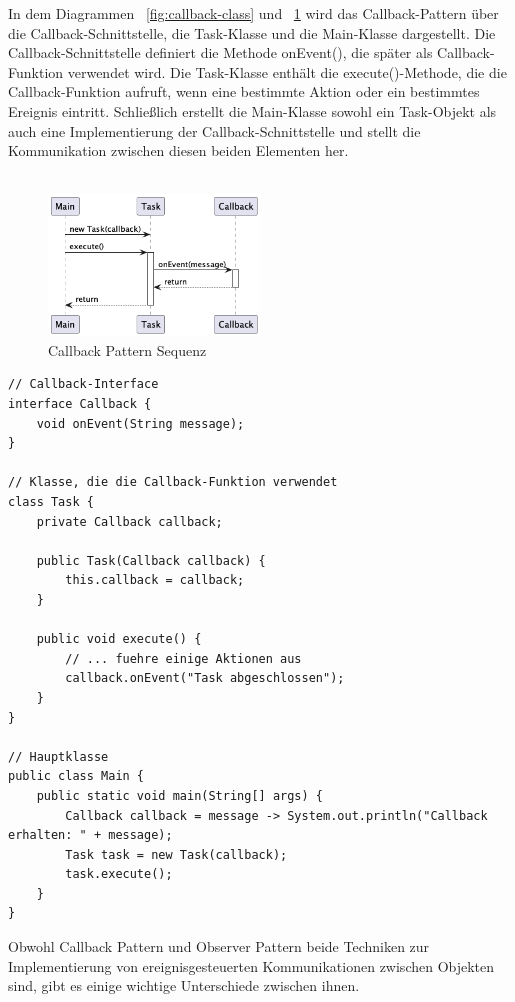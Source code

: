In dem Diagrammen ~\ref{fig:callback-class} und ~\ref{fig:callback-seq} wird das Callback-Pattern über die Callback-Schnittstelle, die Task-Klasse und die Main-Klasse dargestellt. Die Callback-Schnittstelle definiert die Methode onEvent(), die später als Callback-Funktion verwendet wird. Die Task-Klasse enthält die execute()-Methode, die die Callback-Funktion aufruft, wenn eine bestimmte Aktion oder ein bestimmtes Ereignis eintritt. Schließlich erstellt die Main-Klasse sowohl ein Task-Objekt als auch eine Implementierung der Callback-Schnittstelle und stellt die Kommunikation zwischen diesen beiden Elementen her.\\\\
\begin{figure}[!ht]
  \centering
  \includegraphics[width=0.50\textwidth]{fig/uml/callback-seq.png}
  \caption{Callback Pattern Sequenz}
  \label{fig:callback-seq}
\end{figure}
\noindent\begin{minipage}{\textwidth}
\begin{lstlisting}[caption={Callback Pattern},captionpos=b,label={lst:callback}]
// Callback-Interface
interface Callback {
    void onEvent(String message);
}

// Klasse, die die Callback-Funktion verwendet
class Task {
    private Callback callback;

    public Task(Callback callback) {
        this.callback = callback;
    }

    public void execute() {
        // ... fuehre einige Aktionen aus
        callback.onEvent("Task abgeschlossen");
    }
}

// Hauptklasse
public class Main {
    public static void main(String[] args) {
        Callback callback = message -> System.out.println("Callback erhalten: " + message);
        Task task = new Task(callback);
        task.execute();
    }
}
\end{lstlisting}
\end{minipage}
Obwohl Callback Pattern und Observer Pattern beide Techniken zur Implementierung von ereignisgesteuerten Kommunikationen zwischen Objekten sind, gibt es einige wichtige Unterschiede zwischen ihnen.

